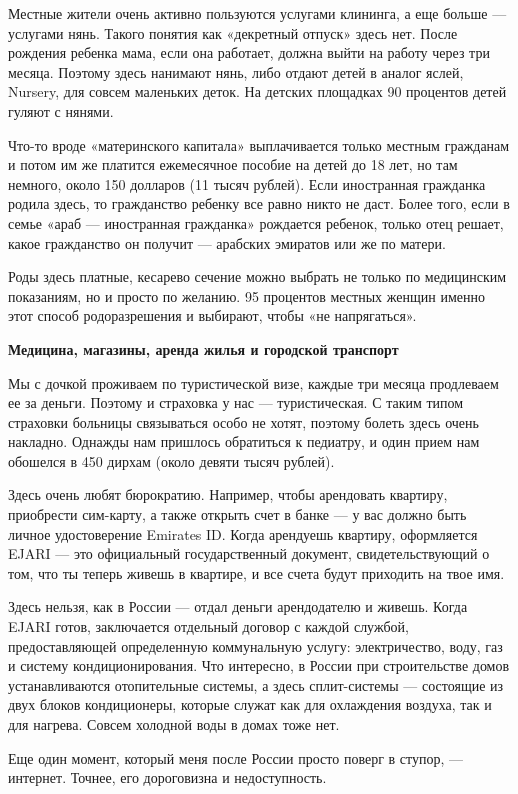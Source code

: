 Местные жители очень активно пользуются услугами клининга, а еще больше — услугами нянь. Такого понятия как «декретный отпуск» здесь нет. После рождения ребенка мама, если она работает, должна выйти на работу через три месяца. Поэтому здесь нанимают нянь, либо отдают детей в аналог яслей, Nursery, для совсем маленьких деток. На детских площадках 90 процентов детей гуляют с нянями.

Что-то вроде «материнского капитала» выплачивается только местным гражданам и потом им же платится ежемесячное пособие на детей до 18 лет, но там немного, около 150 долларов (11 тысяч рублей). Если иностранная гражданка родила здесь, то гражданство ребенку все равно никто не даст. Более того, если в семье «араб — иностранная гражданка» рождается ребенок, только отец решает, какое гражданство он получит — арабских эмиратов или же по матери.

Роды здесь платные, кесарево сечение можно выбрать не только по медицинским показаниям, но и просто по желанию. 95 процентов местных женщин именно этот способ родоразрешения и выбирают, чтобы «не напрягаться».

\textbf{Медицина, магазины, аренда жилья и городской транспорт}

Мы с дочкой проживаем по туристической визе, каждые три месяца продлеваем ее за деньги. Поэтому и страховка у нас — туристическая. С таким типом страховки больницы связываться особо не хотят, поэтому болеть здесь очень накладно. Однажды нам пришлось обратиться к педиатру, и один прием нам обошелся в 450 дирхам (около девяти тысяч рублей).


Здесь очень любят бюрократию. Например, чтобы арендовать квартиру, приобрести сим-карту, а также открыть счет в банке — у вас должно быть личное удостоверение Emirates ID. Когда арендуешь квартиру, оформляется EJARI — это официальный государственный документ, свидетельствующий о том, что ты теперь живешь в квартире, и все счета будут приходить на твое имя.

Здесь нельзя, как в России — отдал деньги арендодателю и живешь. Когда EJARI готов, заключается отдельный договор с каждой службой, предоставляющей определенную коммунальную услугу: электричество, воду, газ и систему кондиционирования. Что интересно, в России при строительстве домов устанавливаются отопительные системы, а здесь сплит-системы — состоящие из двух блоков кондиционеры, которые служат как для охлаждения воздуха, так и для нагрева. Совсем холодной воды в домах тоже нет.

Еще один момент, который меня после России просто поверг в ступор, — интернет. Точнее, его дороговизна и недоступность.

